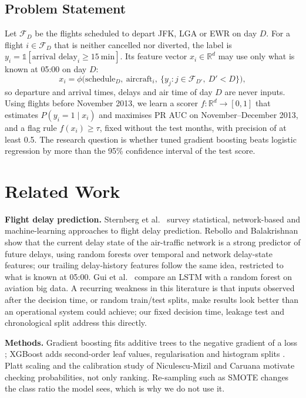 \documentclass[conference]{IEEEtran}
\begin{document}
\subsection{Problem Statement}
Let $\mathcal{F}_D$ be the flights scheduled to depart JFK, LGA or EWR on day $D$. For a flight $i \in \mathcal{F}_D$ that is neither cancelled nor diverted, the label is $y_i = \mathbb{1}[\text{arrival delay}_i \geq 15\ \text{min}]$. Its feature vector $x_i \in \mathbb{R}^d$ may use only what is known at 05:00 on day $D$:
\begin{equation}
x_i = \phi\big(\text{schedule}_D,\ \text{aircraft}_i,\ \{y_j : j \in \mathcal{F}_{D'},\ D' < D\}\big),
\end{equation}
so departure and arrival times, delays and air time of day $D$ are never inputs. Using flights before November 2013, we learn a scorer $f: \mathbb{R}^d \to [0,1]$ that estimates $P(y_i = 1 \mid x_i)$ and maximises PR AUC on November--December 2013, and a flag rule $f(x_i) \geq \tau$, fixed without the test months, with precision of at least 0.5. The research question is whether tuned gradient boosting beats logistic regression by more than the 95\% confidence interval of the test score.

\section{Related Work}
\textbf{Flight delay prediction.} Sternberg et al.\ \cite{sternberg2017} survey statistical, network-based and machine-learning approaches to flight delay prediction. Rebollo and Balakrishnan \cite{rebollo2014} show that the current delay state of the air-traffic network is a strong predictor of future delays, using random forests over temporal and network delay-state features; our trailing delay-history features follow the same idea, restricted to what is known at 05:00. Gui et al.\ \cite{gui2020} compare an LSTM with a random forest on aviation big data. A recurring weakness in this literature is that inputs observed after the decision time, or random train/test splits, make results look better than an operational system could achieve; our fixed decision time, leakage test and chronological split address this directly.

\textbf{Methods.} Gradient boosting fits additive trees to the negative gradient of a loss \cite{friedman2001}; XGBoost adds second-order leaf values, regularisation and histogram splits \cite{chen2016}. Platt scaling \cite{platt1999} and the calibration study of Niculescu-Mizil and Caruana \cite{niculescu2005} motivate checking probabilities, not only ranking. Re-sampling such as SMOTE \cite{chawla2002} changes the class ratio the model sees, which is why we do not use it.
\end{document}
